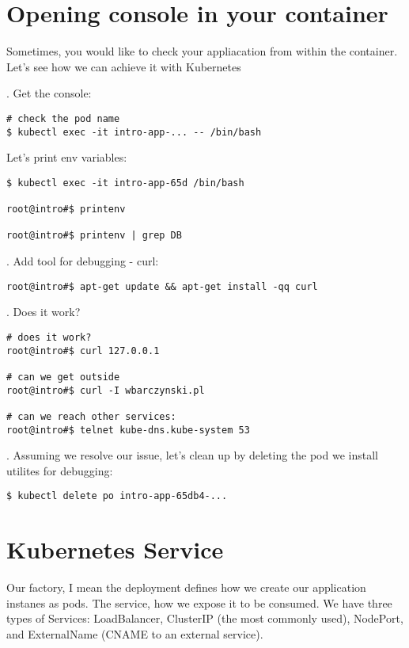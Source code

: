 \documentclass[12pt, letterpaper]{article}
\begin{document}
\pagebreak
\section{Opening console in your container}

Sometimes, you would like to check your appliacation from within the container. Let's see how we can achieve it with Kubernetes

. Get the console:

\begin{verbatim}
# check the pod name
$ kubectl exec -it intro-app-... -- /bin/bash
\end{verbatim}

Let's print env variables:

\begin{verbatim}
$ kubectl exec -it intro-app-65d /bin/bash

root@intro#$ printenv

root@intro#$ printenv | grep DB
\end{verbatim}

. Add tool for debugging - curl:

\begin{verbatim}
root@intro#$ apt-get update && apt-get install -qq curl
\end{verbatim}

. Does it work?

\begin{verbatim}
# does it work?
root@intro#$ curl 127.0.0.1

# can we get outside
root@intro#$ curl -I wbarczynski.pl

# can we reach other services:
root@intro#$ telnet kube-dns.kube-system 53
\end{verbatim}

. Assuming we resolve our issue, let's clean up by deleting the pod we install utilites for debugging:

\begin{verbatim}
$ kubectl delete po intro-app-65db4-...
\end{verbatim}
%
%
%
\pagebreak
\section{Kubernetes Service}

Our factory, I mean the deployment defines how we create our application instanes as pods. The service, how we expose it to be consumed. We have three types of Services: LoadBalancer, ClusterIP (the most commonly used), NodePort, and ExternalName ({\small CNAME} to an external service).
\end{document}
